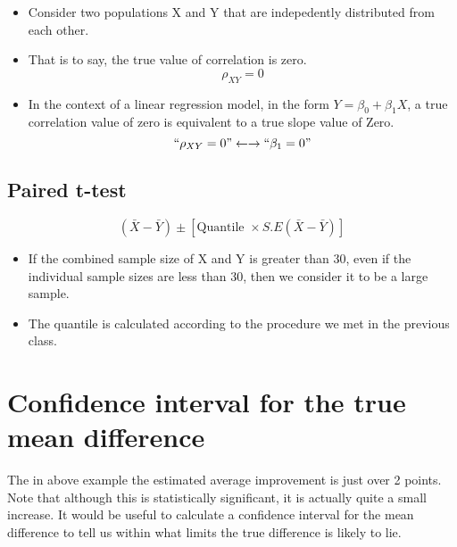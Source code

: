 \documentclass[]{report}
\begin{document}
\begin{itemize}
\item Consider two populations X and Y that are indepedently distributed from
each other.
\item That is to say, the true value of correlation is zero.
\[\rho_{XY} = 0 \]
\item In the context of a linear regression model, in the form $Y=\beta_0  +  \beta_1X$, a true correlation value of zero is equivalent to a true slope value of Zero.
\[``\rho_{XY} = 0" \leftarrow\rightarrow ``\beta_1=0"\]
\end{itemize}




\subsection{Paired t-test}









\[ ( \bar{X} - \bar{Y} ) \pm \left[ \mbox{Quantile } \times S.E(\bar{X}-\bar{Y}) \right] \]
\begin{itemize}
\item If the combined sample size of X and Y is greater than 30, even if the individual sample sizes are less than 30, then we consider it to be a large sample.
\item The quantile is calculated according to the procedure we met in the previous class.


\end{itemize}








\section{Confidence interval for the true mean difference}
The in above example the estimated average improvement is just over 2 points. Note that
although this is statistically significant, it is actually quite a small increase. It would be
useful to calculate a confidence interval for the mean difference to tell us within what limits
the true difference is likely to lie. 
\end{document}
